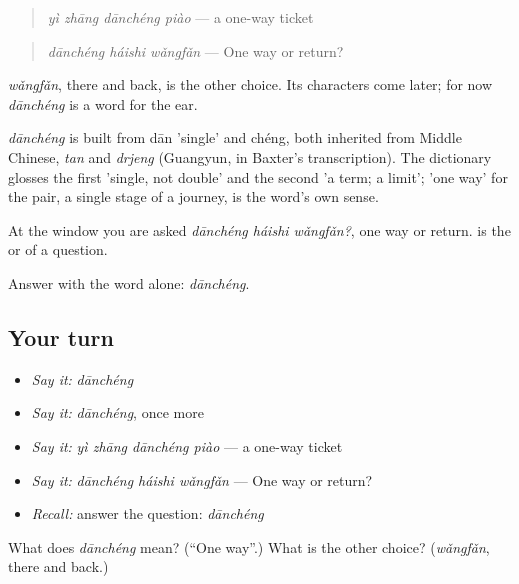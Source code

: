 \begin{quote}
\emph{yì zhāng dānchéng piào} — a one-way ticket
\end{quote}

\begin{quote}
\emph{dānchéng háishi wǎngfǎn} — One way or return?
\end{quote}

\emph{wǎngfǎn}, there and back, is the other choice. Its characters come later; for now \emph{dānchéng} is a word for the ear.

\begin{cousinweb}
\emph{dānchéng} is built from dān 'single' and chéng, both inherited from Middle Chinese, \emph{tan} and \emph{drjeng} (Guangyun, in Baxter's transcription). The dictionary glosses the first 'single, not double' and the second 'a term; a limit'; 'one way' for the pair, a single stage of a journey, is the word's own sense.
\end{cousinweb}

\begin{grammarlens}[title={What you've built}]
At the window you are asked \emph{dānchéng háishi wǎngfǎn?}, one way or return.  is the or of a question.

Answer with the word alone: \emph{dānchéng}.
\end{grammarlens}

\subsection*{Your turn}
\begin{itemize}
\raggedright
  \item \emph{Say it:} \emph{dānchéng}
  \item \emph{Say it:} \emph{dānchéng}, once more
  \item \emph{Say it:} \emph{yì zhāng dānchéng piào} — a one-way ticket
  \item \emph{Say it:} \emph{dānchéng háishi wǎngfǎn} — One way or return?
  \item \emph{Recall:} answer the question: \emph{dānchéng}
\end{itemize}

\begin{tcolorbox}[breakable,colback=teal!4,colframe=teal!35!black,title={Before you move on}]
What does \emph{dānchéng} mean? (\textquotedblleft{}One way\textquotedblright{}.) What is the other choice? (\emph{wǎngfǎn}, there and back.)
\end{tcolorbox}
